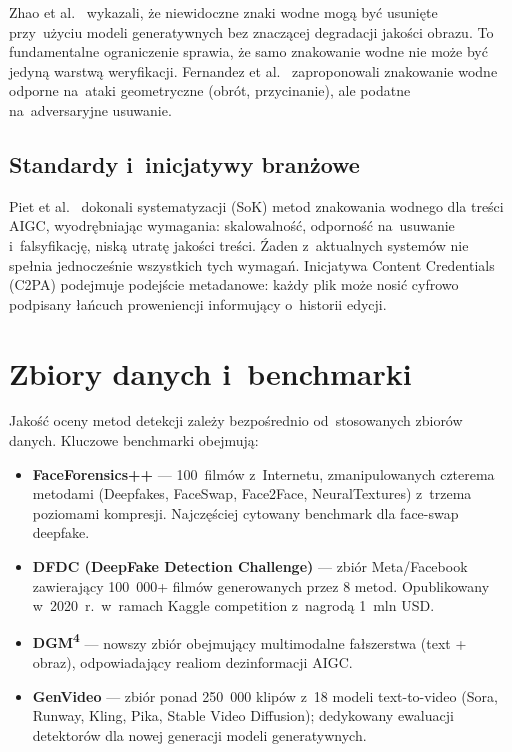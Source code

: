 Zhao et al.\ \cite{Zhao2023InvisibleRemovable} wykazali,
\.{z}e niewidoczne znaki wodne mog\k{a} by\'{c} usuni\k{e}te
przy~u\.{z}yciu modeli generatywnych bez znacz\k{a}cej degradacji jako\'{s}ci obrazu.
To fundamentalne ograniczenie sprawia, \.{z}e samo znakowanie wodne
nie mo\.{z}e by\'{c} jedyn\k{a} warstw\k{a} weryfikacji.
Fernandez et al.\ \cite{Fernandez2024BlindWatermark} zaproponowali
znakowanie wodne odporne na~ataki geometryczne (obr\'{o}t, przycinanie),
ale podatne na~adversaryjne usuwanie.

\subsection{Standardy i~inicjatywy bran\.{z}owe}

Piet et al.\ \cite{Piet2024SoKWatermarking} dokonali systematyzacji
(SoK) metod znakowania wodnego dla tre\'{s}ci AIGC, wyodr\k{e}bniaj\k{a}c
wymagania: skalowalno\'{s}\'{c}, odporno\'{s}\'{c} na~usuwanie i~falsyfikacj\k{e},
nisk\k{a} utrat\k{e} jako\'{s}ci tre\'{s}ci. \'{Z}aden z~aktualnych system\'{o}w
nie spe\l{}nia jednocze\'{s}nie wszystkich tych wymaga\'{n}.
Inicjatywa Content Credentials (C2PA) \cite{C2PA2024Spec} podejmuje
podej\'{s}cie metadanowe: ka\.{z}dy plik mo\.{z}e nosi\'{c} cyfrowo podpisany
\l{}a\'{n}cuch proweniencji informuj\k{a}cy o~historii edycji.

\section{Zbiory danych i~benchmarki}
\label{sec:zbiory_danych_lit}

Jako\'{s}\'{c} oceny metod detekcji zale\.{z}y bezpo\'{s}rednio od~stosowanych
zbior\'{o}w danych. Kluczowe benchmarki obejmuj\k{a}:

\begin{itemize}
  \item \textbf{FaceForensics++} \cite{Rossler2019FaceForensics} ---
        100~film\'{o}w z~Internetu, zmanipulowanych czterema
        metodami (Deepfakes, FaceSwap, Face2Face, NeuralTextures)
        z~trzema poziomami kompresji. Najcz\k{e}\'{s}ciej cytowany benchmark
        dla face-swap deepfake.
  \item \textbf{DFDC (DeepFake Detection Challenge)} \cite{Dolhansky2020DFDC} ---
        zbi\'{o}r Meta/Facebook zawieraj\k{a}cy 100~000+ film\'{o}w
        generowanych przez 8 metod. Opublikowany w~2020~r.~w~ramach
        Kaggle competition z~nagrod\k{a} 1~mln USD.
  \item \textbf{DGM\textsuperscript{4}} \cite{Shao2023DGM4} ---
        nowszy zbi\'{o}r obejmuj\k{a}cy multimodalne fa\l{}szerstwa
        (text + obraz), odpowiadaj\k{a}cy realiom dezinformacji AIGC.
  \item \textbf{GenVideo} \cite{Sun2024GenVideo} ---
        zbi\'{o}r ponad 250~000 klip\'{o}w z~18 modeli text-to-video
        (Sora, Runway, Kling, Pika, Stable Video Diffusion);
        dedykowany ewaluacji detektor\'{o}w dla nowej generacji
        modeli generatywnych.
\end{itemize}

